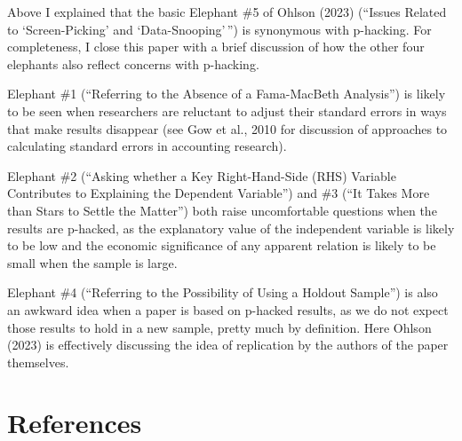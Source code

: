 \documentclass[
  letterpaper,
  DIV=11,
  numbers=noendperiod]{scrartcl}
\begin{document}
Above I explained that the basic Elephant \#5 of Ohlson (2023) (``Issues
Related to `Screen-Picking' and `Data-Snooping'\,'') is synonymous with
p-hacking. For completeness, I close this paper with a brief discussion
of how the other four elephants also reflect concerns with p-hacking.

Elephant \#1 (``Referring to the Absence of a Fama-MacBeth Analysis'')
is likely to be seen when researchers are reluctant to adjust their
standard errors in ways that make results disappear (see Gow et al.,
2010 for discussion of approaches to calculating standard errors in
accounting research).

Elephant \#2 (``Asking whether a Key Right-Hand-Side (RHS) Variable
Contributes to Explaining the Dependent Variable'') and \#3 (``It Takes
More than Stars to Settle the Matter'') both raise uncomfortable
questions when the results are p-hacked, as the explanatory value of the
independent variable is likely to be low and the economic significance
of any apparent relation is likely to be small when the sample is large.

Elephant \#4 (``Referring to the Possibility of Using a Holdout
Sample'') is also an awkward idea when a paper is based on p-hacked
results, as we do not expect those results to hold in a new sample,
pretty much by definition. Here Ohlson (2023) is effectively discussing
the idea of replication by the authors of the paper themselves.

\hypertarget{references}{%
\section*{References}\label{references}}
\end{document}
